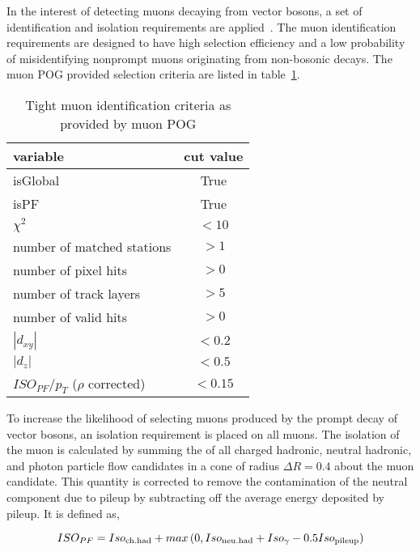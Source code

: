 In the interest of detecting muons decaying from vector bosons, a set of
identification and isolation requirements are
applied~\cite{Sirunyan:2018fpa}.  The muon identification requirements
are designed to have high selection efficiency and a low probability of
misidentifying nonprompt muons originating from non-bosonic decays.  The
muon POG provided selection criteria are listed in
table~\ref{tab:muon_id}.

\begin{table}[h]
    \begin{center}
    \caption{Tight muon identification criteria as provided by muon POG 
    \label{tab:muon_id}
    }
    \begin{tabular}{l|c}
    variable                            & cut value \\
    \hline
    isGlobal                            & True      \\
    isPF                                & True      \\
    $\chi^{2}$                          & $< 10$    \\
    number of matched stations          & $> 1$     \\
    number of pixel hits                & $> 0$     \\
    number of track layers              & $> 5$     \\
    number of valid hits                & $> 0$     \\
    $|d_{xy}|$                          & $< 0.2$   \\
    $|d_{z}|$                           & $< 0.5$    \\
    \hline
    $ISO_{PF}/p_{T}$ ($\rho$ corrected) & $< 0.15$
    \end{tabular}
    \end{center}
\end{table}

\noindent 
To increase the likelihood of selecting muons produced by the
prompt decay of vector bosons, an isolation requirement is placed on all
muons.  The isolation of the muon is calculated by summing the \pt of
all charged hadronic, neutral hadronic, and photon particle flow
candidates in a cone of radius $\Delta R = 0.4$ about the muon
candidate.  This quantity is corrected to remove the contamination of
the neutral component due to pileup by subtracting off the average
energy deposited by pileup.  It is defined as,

\begin{equation}
    ISO_{PF} = Iso_{\rm ch. had} + max \left(0, Iso_{\rm neu. had} +
    Iso_{\gamma} - 0.5 Iso_{\rm pileup}\right)
\end{equation}

